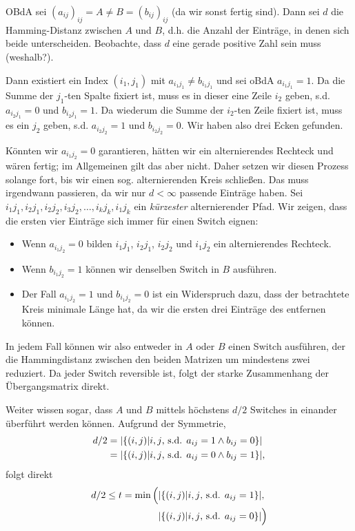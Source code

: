 \begin{theorem}
    OBdA sei $(a_{ij})_{ij} = A \ne B = (b_{ij})_{ij}$ (da wir sonst fertig sind).
    Dann sei $d$ die Hamming-Distanz zwischen $A$ und $B$, d.h. die Anzahl der Einträge, in denen sich beide unterscheiden.
    Beobachte, dass $d$ eine gerade positive Zahl sein muss (weshalb?).

    Dann existiert ein Index $(i_1, j_1)$ mit $a_{i_1j_1} \ne b_{i_1j_1}$ und sei oBdA $a_{i_1j_1} = 1$.
    Da die Summe der $j_1$-ten Spalte fixiert ist, muss es in dieser eine Zeile $i_2$ geben, s.d. $a_{i_2j_1} = 0$ und $b_{i_2j_1} = 1$.
    Da wiederum die Summe der $i_2$-ten Zeile fixiert ist, muss es ein $j_2$ geben, s.d. $a_{i_2j_2} = 1$ und $b_{i_2j_2} = 0$.
    Wir haben also drei Ecken gefunden.

    Könnten wir $a_{i_1j_2} = 0$ garantieren, hätten wir ein alternierendes Rechteck und wären fertig;
    im Allgemeinen gilt das aber nicht.
    Daher setzen wir diesen Prozess solange fort, bis wir einen sog. alternierenden Kreis schließen.
    Das muss irgendwann passieren, da wir nur $d < \infty$ passende Einträge haben.
    Sei $i_1j_1, i_2j_1, i_2j_2, i_3j_2, \ldots, i_kj_k, i_1j_k$ ein \emph{kürzester} alternierender Pfad.
    Wir zeigen, dass die ersten vier Einträge sich immer für einen Switch eignen:
    \begin{itemize}
        \item Wenn $a_{i_1j_2} = 0$ bilden $i_1j_1$, $i_2j_1$, $i_2j_2$ und $i_1j_2$ ein alternierendes Rechteck.
        \item Wenn $b_{i_1j_2} = 1$ können wir denselben Switch in $B$ ausführen.
        \item Der Fall $a_{i_1j_2} = 1$ und $b_{i_1j_2} = 0$ ist ein Widerspruch dazu, dass der betrachtete Kreis minimale Länge hat, da wir die ersten drei Einträge des entfernen können.
    \end{itemize}

    In jedem Fall können wir also entweder in $A$ oder $B$ einen Switch ausführen, der die Hammingdistanz zwischen den beiden Matrizen um mindestens zwei reduziert.
    Da jeder Switch reversible ist, folgt der starke Zusammenhang der Übergangsmatrix direkt.

    Weiter wissen sogar, dass $A$ und $B$ mittels höchstens $d/2$ Switches in einander überführt werden können.
    Aufgrund der Symmetrie,
    \begin{align}
        d/2 & = \lvert \left\{ (i, j) \middle| i, j \text{, s.d. } a_{ij} = 1 \land b_{ij} = 0\right\}\rvert  \\
            & = \lvert \left\{ (i, j) \middle| i, j \text{, s.d. } a_{ij} = 0 \land b_{ij} = 1\right\}\rvert,
    \end{align}
    folgt direkt
    \begin{align}
        d/2 \le t =  \min\Big(
         & \lvert \left\{ (i, j) \middle| i, j \text{, s.d. } a_{ij} = 1\right\}\rvert,       \\
         & \lvert \left\{ (i, j) \middle| i, j \text{, s.d. } a_{ij} = 0\right\}\rvert  \Big)
    \end{align}
\end{theorem}

